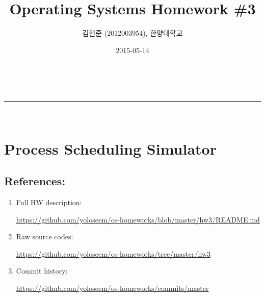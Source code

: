 \documentclass[a4paper,11pt]{article}
\makeatletter
\newcommand{\linia}{\rule{\linewidth}{0.5pt}}
\renewcommand{\maketitle}{
\begin{center}
\vspace{2ex}
{\huge \textsc{\@title}}
\vspace{1ex}
\\
\linia\\
\@author \hfill \@date
\vspace{4ex}
\end{center}
}
\makeatother
\begin{document}
\title{Operating Systems Homework \#3}

\author{김현준 (2012003954), 한양대학교}

\date{2015-05-14}

\maketitle

\section*{Process Scheduling Simulator}

\subsection*{References:}
\begin{enumerate}
\item
    Full HW description:

        \url{https://github.com/yoloseem/os-homeworks/blob/master/hw3/README.md}

\item
    Raw source codes:

        \url{https://github.com/yoloseem/os-homeworks/tree/master/hw3}

\item
    Commit history:

        \url{https://github.com/yoloseem/os-homeworks/commits/master}
\end{enumerate}
\end{document}
